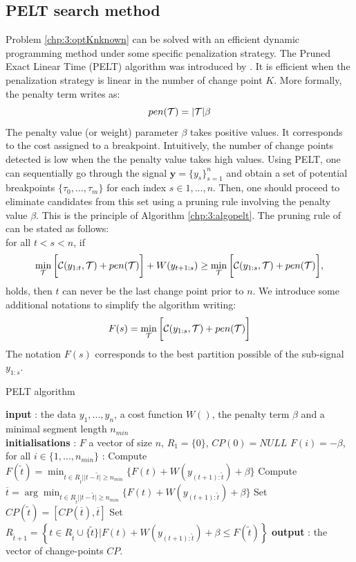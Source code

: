 \subsection{PELT search method}

Problem \eqref{chp:3:optKnknown} can be solved with an efficient dynamic programming method under some specific penalization strategy. The Pruned Exact Linear Time (PELT) algorithm was introduced by \cite{Killick2012}. It is efficient when the penalization strategy is linear in the number of change point $K$. More formally, the penalty term writes as:
$$pen({\mathcal T}) = \lvert{\mathcal T}\rvert\beta$$ 
The penalty value (or weight) parameter $\beta$ takes positive values. It corresponds to the cost assigned to a breakpoint. Intuitively, the number of change points detected is low when the the penalty value takes high values. Using PELT, one can sequentially go through the signal $\bm y = \{y_s\}_{s=1}^n$ and obtain a set of potential breakpoints $\{\tau_0,...,\tau_m\}$ for each index $s \in {1,...,n}$. Then, one should proceed to eliminate candidates from this set using a pruning rule involving the penalty value $\beta$. This is the principle of Algorithm \ref{chp:3:algopelt}. The pruning rule of \cite{Killick2012} can be stated as follows: \\
 for all $t <s < n$, if
\begin{equation}\label{chp:3:pruning}
 \min_{{\mathcal T}}\bigg[{\mathcal C}(y_{1:t},{\mathcal T})+pen({\mathcal T})\bigg] + W(y_{t+1:s}) \geq \min_{{\mathcal T}}\bigg[{\mathcal C}(y_{1:s},{\mathcal T})+pen({\mathcal T})\bigg], 
\end{equation}
holds, then $t$ can never be the last change point prior to $n$. We introduce some additional notations to simplify the algorithm writing:  
$$F(s) = \min_{{\mathcal T}}\bigg[{\mathcal C}(y_{1:s},{\mathcal T})+pen({\mathcal T})\bigg]$$
The notation $F(s)$ corresponds to the best partition possible of the sub-signal $y_{1:s}$. 
\begin{algorithm}[ht]
\caption{PELT algorithm}\label{chp:3:algopelt}
\begin{algorithmic}
\State \textbf{input} : the data $y_{1},...,y_{n}$, a cost function $W()$, the penalty term $\beta$ and a minimal segment length $n_{min}$ \\
  \State \textbf{initialisations} : $F$ a vector of size $n$, $R_{1}=\lbrace 0\rbrace$, $CP(0)=NULL$  
  \State $F(i) = -\beta$, for all $i \in \{1,...,n_{min}\}$
   :
  \State Compute 
  $ F(\tilde t)=\min_{t\in R_{\tilde t}\vert \lvert t-\tilde{t}\rvert \geq n_{min}}\lbrace F(t)+W(y_{(t+1):\tilde t})+\beta\rbrace $
  \State Compute $ \overline t=\arg \min_{t\in R_{\tilde t}\vert \lvert t-\tilde{t}\rvert \geq n_{min}}\lbrace F(t)+W(y_{(t+1):\tilde t})+\beta\rbrace $ 
  \State Set $CP(\tilde t)=[CP(\overline t), \overline t]$
  \State Set $R_{\tilde t+1}=\left\{t\in R_{\tilde t}\cup \lbrace\tilde t\rbrace \vert F(t)+W(y_{(t+1):\tilde t}) +\beta \le F(\tilde t)   \right\}$ 
\EndFor 
\State \textbf{output} : the vector of change-points $CP$. 
\end{algorithmic}
\end{algorithm} 

